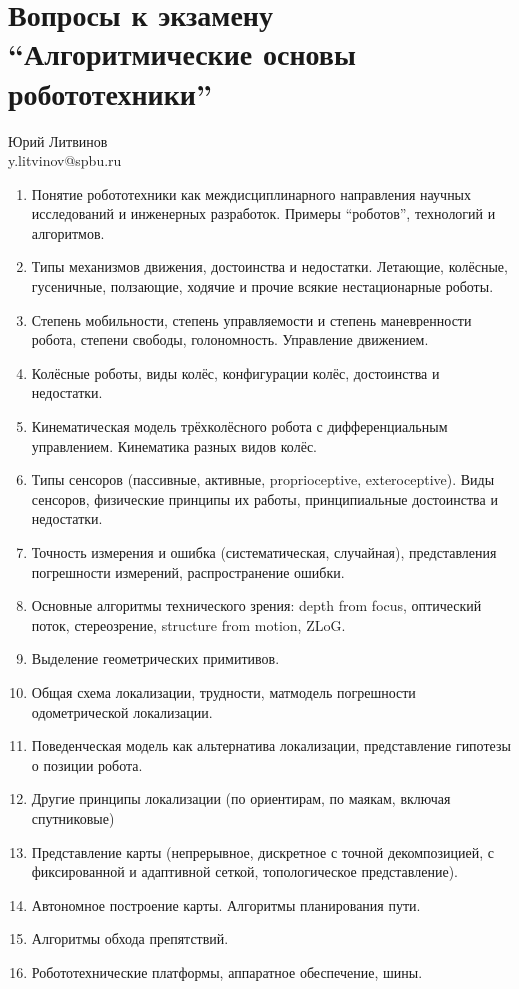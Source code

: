 \documentclass[a5paper]{article}
\begin{document}
\thispagestyle{empty}

\section*{Вопросы к экзамену \enquote{Алгоритмические основы робототехники}}

\begin{flushright}\begin{small}Юрий Литвинов\\\small{y.litvinov@spbu.ru}\end{small}\end{flushright}

\begin{enumerate}
    \item Понятие робототехники как междисциплинарного направления научных исследований и инженерных разработок. Примеры \enquote{роботов}, технологий и алгоритмов. 
    \item Типы механизмов движения, достоинства и недостатки. Летающие, колёсные, гусеничные, ползающие,  ходячие  и прочие всякие нестационарные роботы.
    \item Степень мобильности, степень управляемости и степень маневренности робота, степени свободы, голономность. Управление движением.  
    \item Колёсные роботы, виды колёс, конфигурации колёс, достоинства и недостатки.
    \item Кинематическая модель трёхколёсного робота с дифференциальным управлением. Кинематика разных видов колёс.
    \item Типы сенсоров (пассивные, активные, proprioceptive, exteroceptive). Виды сенсоров, физические принципы их работы, принципиальные достоинства и недостатки.
    \item Точность измерения и ошибка (систематическая, случайная), представления погрешности измерений, распространение ошибки.
    \item Основные алгоритмы технического зрения: depth from focus, оптический поток, стереозрение, structure from motion, ZLoG.
    \item Выделение геометрических примитивов.
    \item Общая схема локализации, трудности, матмодель погрешности одометрической локализации.
    \item Поведенческая модель как альтернатива локализации, представление гипотезы о позиции робота.
    \item Другие принципы локализации (по ориентирам, по маякам, включая спутниковые)
    \item Представление карты (непрерывное, дискретное с точной декомпозицией, с фиксированной и адаптивной сеткой, топологическое представление). 
    \item Автономное построение карты. Алгоритмы планирования пути. 
    \item Алгоритмы обхода препятствий.
    \item Робототехнические платформы, аппаратное обеспечение, шины.
\end{enumerate}
\end{document}
